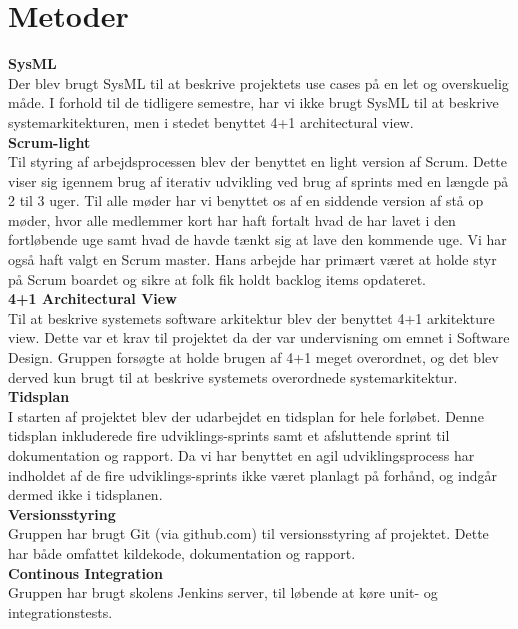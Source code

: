 \section{Metoder}

\textbf{SysML}\\
Der blev brugt SysML til at beskrive projektets use cases på en let og overskuelig måde. I forhold til de tidligere semestre, har vi ikke brugt SysML til at beskrive systemarkitekturen, men i stedet benyttet 4+1 architectural view.\\

\textbf{Scrum-light}\\
Til styring af arbejdsprocessen blev der benyttet en light version af Scrum. Dette viser sig igennem brug af iterativ udvikling ved brug af sprints med en længde på 2 til 3 uger. Til alle møder har vi benyttet os af en siddende version af stå op møder, hvor alle medlemmer kort har haft fortalt hvad de har lavet i den fortløbende uge samt hvad de havde tænkt sig at lave den kommende uge. Vi har også haft valgt en Scrum master. Hans arbejde har primært været at holde styr på Scrum boardet og sikre at folk fik holdt backlog items opdateret.\\

\textbf{4+1 Architectural View} \\
Til at beskrive systemets software arkitektur blev der benyttet 4+1 arkitekture view. Dette var et krav til projektet da der var undervisning om emnet i Software Design. Gruppen forsøgte at holde brugen af 4+1 meget overordnet, og det blev derved kun brugt til at beskrive systemets overordnede systemarkitektur. \\

\textbf{Tidsplan} \\
I starten af projektet blev der udarbejdet en tidsplan for hele forløbet. Denne tidsplan inkluderede fire udviklings-sprints samt et afsluttende sprint til dokumentation og rapport. Da vi har benyttet en agil udviklingsprocess har indholdet af de fire udviklings-sprints ikke været planlagt på forhånd, og indgår dermed ikke i tidsplanen. \\

\textbf{Versionsstyring} \\
Gruppen har brugt Git (via github.com) til versionsstyring af projektet. Dette har både omfattet kildekode, dokumentation og rapport. \\

\textbf{Continous Integration} \\
Gruppen har brugt skolens Jenkins server, til løbende at køre unit- og integrationstests. \\
